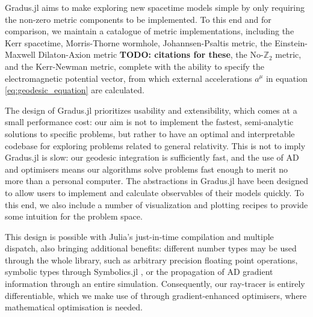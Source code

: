 \documentclass[fleqn,usenatbib]{mnras}
\newcommand{\todo}[1]{{\noindent \bf \color{red} TODO: #1}}
\newcommand{\Gradus}{Gradus.jl\xspace}
\begin{document}
\Gradus aims to make exploring new spacetime models simple by only requiring the
non-zero metric components to be implemented. To this end and for comparison, we
maintain a catalogue of metric implementations, including the Kerr spacetime,
Morris-Thorne wormhole, Johannsen-Psaltis metric, the Einstein-Maxwell
Dilaton-Axion metric \todo{citations for these}, the No-$\mathbb{Z}_2$ metric,
and the Kerr-Newman metric, complete with the ability to specify the
electromagnetic potential vector, from which external accelerations $a^\mu$ in
equation \eqref{eq:geodesic_equation} are calculated.

The design of \Gradus prioritizes usability and extensibility, which comes at a
small performance cost: our aim is not to implement the fastest, semi-analytic
solutions to specific problems, but rather to have an optimal and interpretable
codebase for exploring problems related to general relativity.  This is not to
imply \Gradus is slow: our geodesic integration is sufficiently fast, and the
use of AD and optimisers means our algorithms solve problems fast enough to
merit no more than a personal computer. The abstractions in \Gradus have been
designed to allow users to implement and calculate observables of their models
quickly. To this end, we also include a number of visualization and plotting
recipes to provide some intuition for the problem space.

This design is possible with Julia's just-in-time compilation and multiple
dispatch, also bringing additional benefits: different number types may be used
through the whole library, such as arbitrary precision floating point
operations, symbolic types through Symbolics.jl \citep{symbolics_julia}, or the
propagation of AD gradient information through an entire simulation.
Consequently, our ray-tracer is entirely differentiable, which we make use of
through gradient-enhanced optimisers, where mathematical optimisation is needed.


\end{document}
